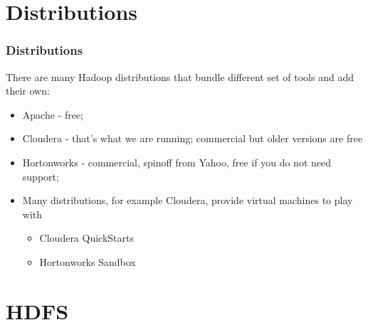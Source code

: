 \documentclass{beamer}
\begin{document}
\section{Distributions}
\begin{frame}
 \frametitle{Distributions}
 There are many Hadoop distributions that bundle different set of tools and add their own:
 \begin{itemize}
  \item {\color{mycolordef}Apache}  - free;
  \item {\color{mycolordef}Cloudera} - that's what we are running; commercial but older versions are free
  \item {\color{mycolordef}Hortonworks}  - commercial, spinoff from Yahoo, free if you do not need support;
  \item Many distributions, for example Cloudera, provide virtual machines to play with
    \begin{itemize}
    \item Cloudera QuickStarts
    \item Hortonworks Sandbox
    \end{itemize}
    




  \end{itemize}
\end{frame}

\section{HDFS}
\end{document}
